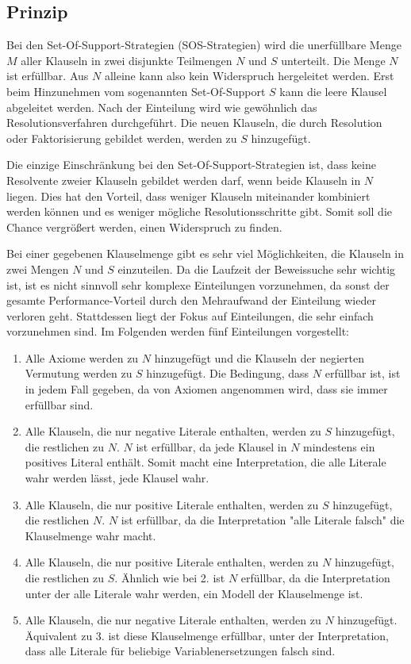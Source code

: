 		\subsection{Prinzip}
Bei den Set-Of-Support-Strategien (SOS-Strategien) wird die unerfüllbare Menge $M$ aller Klauseln in zwei disjunkte Teilmengen $N$ und $S$ unterteilt. Die Menge $N$ ist erfüllbar. Aus $N$ alleine kann also kein Widerspruch hergeleitet werden. Erst beim Hinzunehmen vom sogenannten Set-Of-Support $S$ kann die leere Klausel abgeleitet werden. Nach der Einteilung wird wie gewöhnlich das Resolutionsverfahren durchgeführt. Die neuen Klauseln, die durch Resolution oder Faktorisierung gebildet werden, werden zu $S$ hinzugefügt. 

Die einzige Einschränkung bei den Set-Of-Support-Strategien ist, dass keine Resolvente zweier Klauseln gebildet werden darf, wenn beide Klauseln in $N$ liegen. Dies hat den Vorteil, dass weniger Klauseln miteinander kombiniert werden können und es weniger mögliche Resolutionsschritte gibt. Somit soll die Chance vergrößert werden, einen Widerspruch zu finden.


Bei einer gegebenen Klauselmenge gibt es sehr viel Möglichkeiten, die Klauseln in zwei Mengen $N$ und $S$ einzuteilen. Da die Laufzeit der Beweissuche sehr wichtig ist, ist es nicht sinnvoll sehr komplexe Einteilungen vorzunehmen, da sonst der gesamte Performance-Vorteil durch den Mehraufwand der Einteilung wieder verloren geht. Stattdessen liegt der Fokus auf Einteilungen, die sehr einfach vorzunehmen sind. Im Folgenden werden fünf Einteilungen vorgestellt:
\begin{enumerate}
	\item Alle Axiome werden zu $N$ hinzugefügt und die Klauseln der negierten Vermutung werden zu $S$ hinzugefügt. Die Bedingung, dass $N$ erfüllbar ist, ist in jedem Fall gegeben, da von Axiomen angenommen wird, dass sie immer erfüllbar sind.
	\item Alle Klauseln, die nur negative Literale enthalten, werden zu $S$ hinzugefügt, die restlichen zu $N$. $N$ ist erfüllbar, da jede Klausel in $N$ mindestens ein positives Literal enthält. Somit macht eine Interpretation, die alle Literale wahr werden lässt, jede Klausel wahr.
	\item Alle Klauseln, die nur positive Literale enthalten, werden zu $S$ hinzugefügt, die restlichen $N$. $N$ ist erfüllbar, da die Interpretation "alle Literale falsch" die Klauselmenge wahr macht.
	\item Alle Klauseln, die nur positive Literale enthalten, werden zu $N$ hinzugefügt, die restlichen zu $S$. Ähnlich wie bei 2. ist $N$ erfüllbar, da die Interpretation unter der alle Literale wahr werden, ein Modell der Klauselmenge ist.
	\item Alle Klauseln, die nur negative Literale enthalten, werden zu $N$ hinzugefügt. Äquivalent zu 3. ist diese Klauselmenge erfüllbar, unter der Interpretation, dass alle Literale für beliebige Variablenersetzungen falsch sind.
\end{enumerate}

